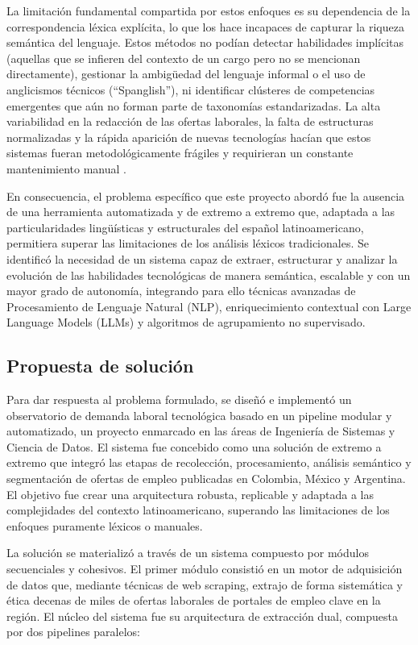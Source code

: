 La limitación fundamental compartida por estos enfoques es su dependencia de la correspondencia léxica explícita, lo que los hace incapaces de capturar la riqueza semántica del lenguaje. Estos métodos no podían detectar habilidades implícitas (aquellas que se infieren del contexto de un cargo pero no se mencionan directamente), gestionar la ambigüedad del lenguaje informal o el uso de anglicismos técnicos (``Spanglish''), ni identificar clústeres de competencias emergentes que aún no forman parte de taxonomías estandarizadas. La alta variabilidad en la redacción de las ofertas laborales, la falta de estructuras normalizadas y la rápida aparición de nuevas tecnologías hacían que estos sistemas fueran metodológicamente frágiles y requirieran un constante mantenimiento manual \parencite{echeverria2022, lukauskas2023}.

En consecuencia, el problema específico que este proyecto abordó fue la ausencia de una herramienta automatizada y de extremo a extremo que, adaptada a las particularidades lingüísticas y estructurales del español latinoamericano, permitiera superar las limitaciones de los análisis léxicos tradicionales. Se identificó la necesidad de un sistema capaz de extraer, estructurar y analizar la evolución de las habilidades tecnológicas de manera semántica, escalable y con un mayor grado de autonomía, integrando para ello técnicas avanzadas de Procesamiento de Lenguaje Natural (NLP), enriquecimiento contextual con Large Language Models (LLMs) y algoritmos de agrupamiento no supervisado.

\subsection{Propuesta de solución}

Para dar respuesta al problema formulado, se diseñó e implementó un observatorio de demanda laboral tecnológica basado en un pipeline modular y automatizado, un proyecto enmarcado en las áreas de Ingeniería de Sistemas y Ciencia de Datos. El sistema fue concebido como una solución de extremo a extremo que integró las etapas de recolección, procesamiento, análisis semántico y segmentación de ofertas de empleo publicadas en Colombia, México y Argentina. El objetivo fue crear una arquitectura robusta, replicable y adaptada a las complejidades del contexto latinoamericano, superando las limitaciones de los enfoques puramente léxicos o manuales.

La solución se materializó a través de un sistema compuesto por módulos secuenciales y cohesivos. El primer módulo consistió en un motor de adquisición de datos que, mediante técnicas de web scraping, extrajo de forma sistemática y ética decenas de miles de ofertas laborales de portales de empleo clave en la región. El núcleo del sistema fue su arquitectura de extracción dual, compuesta por dos pipelines paralelos:

